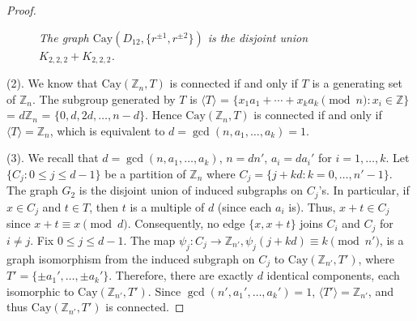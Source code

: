\documentclass[10pt,a4paper]{amsart}
\begin{document}
\begin{proof}
\begin{figure}[h]
\vspace{-4.5em}
\caption{\em The graph $\mathrm{Cay}(D_{12}, \{r^{\pm1}, r^{\pm2}\})$ is the disjoint union $K_{2,2,2} + K_{2,2,2}$.}
\end{figure}


(2). We know that $\mathrm{Cay}(\mathbb{Z}_n, T)$ is connected if and only if $T$ is a generating set of $\mathbb{Z}_{n}$.  
The subgroup generated by $T$ is 
$\langle T \rangle$ = $\{ x_1 a_1 + \cdots + x_k a_k \pmod{n} : x_i \in \mathbb{Z} \}$
= $d \mathbb{Z}_n$
= $\{ 0, d, 2d, \dots, n - d \}$.  
Hence $\mathrm{Cay}(\mathbb{Z}_n, T)$ is connected if and only if $\langle T \rangle = \mathbb{Z}_n$, which is equivalent to $d=\gcd(n, a_1, \dots, a_k) = 1$.

(3). We recall that $d = \gcd(n, a_1, \dots, a_k)$, $n = d n'$, $a_i = d a_i'$ for $i = 1, \dots, k$.  
Let $\{ C_j : 0 \le j \le d-1 \}$ be a partition of $\mathbb{Z}_{n}$ where 
$C_j = \{j + k d : k = 0, \dots, n'-1\}$.
The graph $G_2$ is the disjoint union of induced subgraphs on $C_j$'s.  
In particular, if $x \in C_j$ and $t \in T$, then $t$ is a multiple of $d$ (since each $a_i$ is).  
Thus, $x + t \in C_j$ since $x + t \equiv x \pmod{d}$.  
Consequently, no edge $\{ x, x + t \}$ joins $C_i$ and $C_j$ for $i \ne j$.
Fix $0 \le j \le d-1$.  
The map 
$\psi_j : C_j \to \mathbb{Z}_{n'}, \psi_j(j + k d) \equiv k \pmod{n'}$,
is a graph isomorphism from the induced subgraph on $C_j$ to 
$\mathrm{Cay}(\mathbb{Z}_{n'}, T')$,  
where $T' = \{\pm a_1', \dots, \pm a_k'\}$.  
Therefore, there are exactly $d$ identical components, each isomorphic to $\mathrm{Cay}(\mathbb{Z}_{n'}, T')$.  
Since $\gcd(n', a_1', \dots, a_k') = 1$, $\langle T' \rangle = \mathbb{Z}_{n'}$, and thus $\mathrm{Cay}(\mathbb{Z}_{n'}, T')$ is connected.  
\end{proof}
\end{document}
